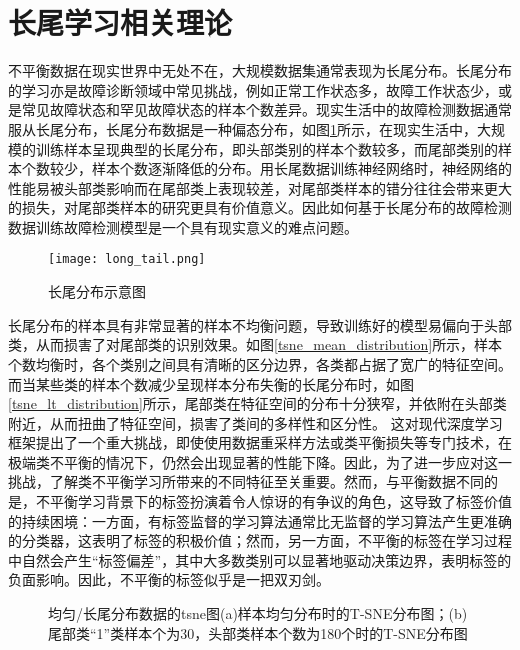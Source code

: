 \documentclass[master]{thesis-uestc}
\begin{document}
\section{长尾学习相关理论}
不平衡数据在现实世界中无处不在，大规模数据集通常表现为长尾分布。长尾分布的学习亦是故障诊断领域中常见挑战，例如正常工作状态多，故障工作状态少，或是常见故障状态和罕见故障状态的样本个数差异。现实生活中的故障检测数据通常服从长尾分布，长尾分布数据是一种偏态分布，如图\ref{fig_long_tail}所示，在现实生活中，大规模的训练样本呈现典型的长尾分布，即头部类别的样本个数较多，而尾部类别的样本个数较少，样本个数逐渐降低的分布。用长尾数据训练神经网络时，神经网络的性能易被头部类影响而在尾部类上表现较差，对尾部类样本的错分往往会带来更大的损失，对尾部类样本的研究更具有价值意义。因此如何基于长尾分布的故障检测数据训练故障检测模型是一个具有现实意义的难点问题。
\begin{figure}[h]
    \texttt{[image: long\_tail.png]}
    \caption{长尾分布示意图}
    \label{fig_long_tail}
\end{figure}

长尾分布的样本具有非常显著的样本不均衡问题，导致训练好的模型易偏向于头部类，从而损害了对尾部类的识别效果。如图\ref{tsne_mean_distribution}所示，样本个数均衡时，各个类别之间具有清晰的区分边界，各类都占据了宽广的特征空间。而当某些类的样本个数减少呈现样本分布失衡的长尾分布时，如图\ref{tsne_lt_distribution}所示，尾部类在特征空间的分布十分狭窄，并依附在头部类附近，从而扭曲了特征空间，损害了类间的多样性和区分性。
这对现代深度学习框架提出了一个重大挑战，即使使用数据重采样方法或类平衡损失等专门技术，在极端类不平衡的情况下，仍然会出现显著的性能下降。因此，为了进一步应对这一挑战，了解类不平衡学习所带来的不同特征至关重要。然而，与平衡数据不同的是，不平衡学习背景下的标签扮演着令人惊讶的有争议的角色，这导致了标签价值的持续困境：一方面，有标签监督的学习算法通常比无监督的学习算法产生更准确的分类器，这表明了标签的积极价值；然而，另一方面，不平衡的标签在学习过程中自然会产生“标签偏差”，其中大多数类别可以显著地驱动决策边界，表明标签的负面影响。因此，不平衡的标签似乎是一把双刃剑。
\begin{figure}[h]
    \caption{均匀/长尾分布数据的tsne图(a)样本均匀分布时的T-SNE分布图；(b)尾部类“1”类样本个为30，头部类样本个数为180个时的T-SNE分布图}
    \label{long-tail result}
\end{figure}
\end{document}
